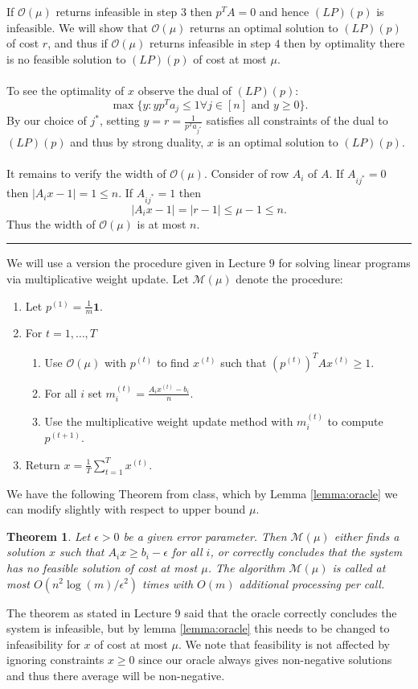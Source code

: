 \documentclass[letterpaper,12pt,oneside,onecolumn]{article}
\newcommand{\cM}{\mathcal{M}} \newcommand{\cN}{\mathcal{N}}
\newcommand{\cO}{\mathcal{O}} \newcommand{\cP}{\mathcal{P}}
\newenvironment{proof}{{\bf Proof:  }}{\hfill\rule{2mm}{2mm}}
\newtheorem{theorem}[fact]{Theorem}
\begin{document}
\begin{proof}
If $\cO(\mu)$ returns infeasible in step $3$ then $p^TA = 0$ and hence $(LP)(p)$ is infeasible. We will show that $\cO(\mu)$ returns an optimal solution to $(LP)(p)$ of cost $r$, and thus if $\cO(\mu)$ returns infeasible in step $4$ then by optimality there is no feasible solution to $(LP)(p)$ of cost  at most $\mu$.
\paragraph{}
To see the optimality of $x$ observe the dual of $(LP)(p)$:
$$\max\{y : yp^Ta_j \leq 1 \forall j \in [n] \text{ and } y \geq 0\}.$$
By our choice of $j^*$, setting $y = r = \frac{1}{p^Ta_{j^*}}$ satisfies all constraints of the dual to $(LP)(p)$ and thus by strong duality, $x$ is an optimal solution to $(LP)(p)$.
\paragraph{}
It remains to verify the width of $\cO(\mu)$. Consider of row $A_i$ of $A$. If $A_{ij^*} = 0$ then $|A_i x - 1 | = 1 \leq n$. If $A_{ij^*} = 1$ then
$$|A_i x - 1| = |r - 1| \leq \mu -1 \leq n.$$
Thus the width of $\cO(\mu)$ is at most $n$.
\end{proof}
We will use a version the procedure given in Lecture $9$ for solving linear programs via multiplicative weight update. Let $\cM(\mu)$ denote the procedure:
\begin{enumerate}
\item Let $p^{(1)} = \frac{1}{m} \mathbf{1}.$
\item For $t = 1, \dots, T$
	\begin{enumerate}
	\item Use $\cO(\mu)$ with $p^{(t)}$ to find $x^{(t)}$ such that $(p^{(t)})^TA x^{(t)} \geq 1.$
	\item For all $i$ set $m_i^{(t)} = \frac{A_ix^{(t)} - b_i}{n}.$
	\item Use the multiplicative weight update method with $m_i^{(t)}$ to compute $p^(t+1)$.
	\end{enumerate}
\item Return $x = \frac{1}{T}\sum_{t=1}^T x^{(t)}.$
\end{enumerate}
We have the following Theorem from class, which by Lemma \ref{lemma:oracle} we can modify slightly with respect to upper bound $\mu$.
\begin{theorem}\label{th:mwu}
Let $\epsilon > 0$ be a given error parameter. Then $\cM(\mu)$ either finds a solution $x$ such that $A_ix\geq b_i - \epsilon$ for all $i$, or correctly concludes that the system has no feasible solution of cost at most $\mu$. The algorithm $\cM(\mu)$ is called at most $O(n^2\log (m) / \epsilon^2)$ times with $O(m)$ additional processing per call.
\end{theorem}
The theorem as stated in Lecture $9$ said that the oracle correctly concludes the system is infeasible, but by lemma \ref{lemma:oracle} this needs to be changed to infeasibility for $x$ of cost at most $\mu$. We note that feasibility is not affected by ignoring constraints $x\geq 0$ since our oracle always gives non-negative solutions and thus there average will be non-negative.
\end{document}
